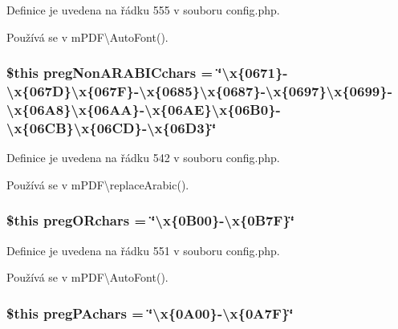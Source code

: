 Definice je uvedena na řádku 555 v souboru config.\-php.



Používá se v m\-P\-D\-F\textbackslash{}\-Auto\-Font().

\hypertarget{config_8php_a15a49b16432aeaf91fc29d004238a6fd}{
\subsubsection[{preg\-Non\-A\-R\-A\-B\-I\-Cchars}]{\setlength{\rightskip}{0pt plus 5cm}\$this preg\-Non\-A\-R\-A\-B\-I\-Cchars = \char`\"{}\textbackslash{}x\{0671\}-\/\textbackslash{}x\{067\-D\}\textbackslash{}x\{067\-F\}-\/\textbackslash{}x\{0685\}\textbackslash{}x\{0687\}-\/\textbackslash{}x\{0697\}\textbackslash{}x\{0699\}-\/\textbackslash{}x\{06\-A8\}\textbackslash{}x\{06\-A\-A\}-\/\textbackslash{}x\{06\-A\-E\}\textbackslash{}x\{06\-B0\}-\/\textbackslash{}x\{06\-C\-B\}\textbackslash{}x\{06\-C\-D\}-\/\textbackslash{}x\{06\-D3\}\char`\"{}}}\label{config_8php_a15a49b16432aeaf91fc29d004238a6fd}


Definice je uvedena na řádku 542 v souboru config.\-php.



Používá se v m\-P\-D\-F\textbackslash{}replace\-Arabic().

\hypertarget{config_8php_a7758a0c88e02187ea13988e4d88a28a0}{
\subsubsection[{preg\-O\-Rchars}]{\setlength{\rightskip}{0pt plus 5cm}\$this preg\-O\-Rchars = \char`\"{}\textbackslash{}x\{0\-B00\}-\/\textbackslash{}x\{0\-B7\-F\}\char`\"{}}}\label{config_8php_a7758a0c88e02187ea13988e4d88a28a0}


Definice je uvedena na řádku 551 v souboru config.\-php.



Používá se v m\-P\-D\-F\textbackslash{}\-Auto\-Font().

\hypertarget{config_8php_abd3a4a038f2da6ab7190a76e73dade23}{
\subsubsection[{preg\-P\-Achars}]{\setlength{\rightskip}{0pt plus 5cm}\$this preg\-P\-Achars = \char`\"{}\textbackslash{}x\{0\-A00\}-\/\textbackslash{}x\{0\-A7\-F\}\char`\"{}}}\label{config_8php_abd3a4a038f2da6ab7190a76e73dade23}


